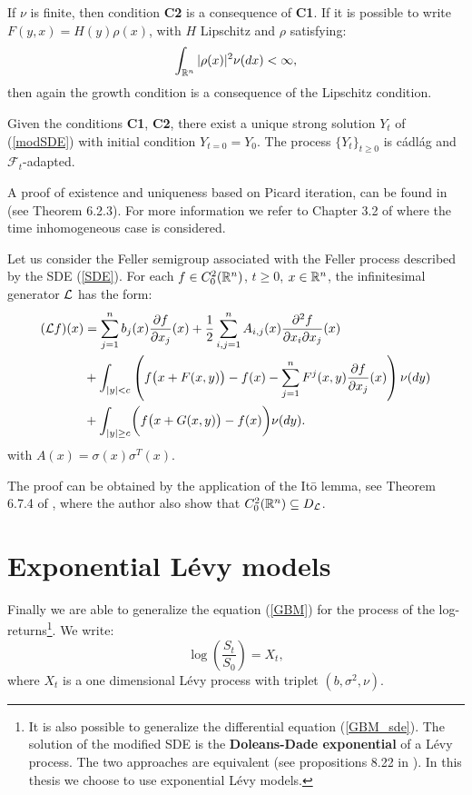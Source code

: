 If $\nu$ is finite, then condition \textbf{C2} is a consequence of \textbf{C1}. If it is possible to write $F(y,x) = H(y)\rho(x)$, with $H$ Lipschitz and 
$\rho$ satisfying:
\begin{equation}\label{rho}
 \int_{\mathbb{R}^n} |\rho(x)|^2 \nu(dx) < \infty,
\end{equation}
then again the growth condition is a consequence of the Lipschitz condition.
\begin{Theorem}
 Given the conditions \textbf{C1}, \textbf{C2}, there exist a unique strong solution $Y_t$ of (\ref{modSDE}) with initial condition $Y_{t=0}=Y_{0}$.
 The process $\{Y_t\}_{t\geq 0}$ is cádlág and $\mathcal{F}_t$-adapted.
\end{Theorem}
A proof of existence and uniqueness based on Picard iteration, can be found in \cite{Applebaum} (see Theorem 6.2.3). For more information we refer to Chapter 3.2 of
\cite{Skorohod} where the time inhomogeneous case is considered. 


\begin{Theorem}
Let us consider the Feller semigroup associated with the Feller process described by the SDE (\ref{SDE}).
For each $f\in C_0^{2}(\mathbb{R}^n)$, $t\geq0$, $x\in \mathbb{R}^n$,
the infinitesimal generator $\mathcal{L}$ has the form:
\begin{align} \label{gen_jumpdiff}
  (\mathcal{L} f)(x) &=  \sum_{j=1}^n b_j(x) \frac{\partial f}{\partial x_j}(x) +
  \frac{1}{2} \sum_{i,j=1}^n A_{i,j}(x) \frac{\partial^2 f}{\partial x_i \partial x_j}(x)\\  \nonumber
           & + \int_{|y|<c} \left( f\bigl(x+F(x,y)\bigr) - f(x) - \sum_{j=1}^n F^j(x,y) \frac{\partial f}{\partial x_j}(x) \right) \nu(dy)  \\ \nonumber
           & + \int_{|y| \geq c} \biggl( f\bigl(x+G(x,y)\bigr) - f(x) \biggr) \nu(dy).   \nonumber
\end{align} 
with $A(x) = \sigma(x) \sigma^T(x)$.
\end{Theorem}
The proof can be obtained by the application of the It\={o} lemma, see Theorem 6.7.4 of \cite{Applebaum}, where the author also show that $C_0^{2}(\mathbb{R}^n) \subseteq D_{\mathcal{L}}$.   




\section{Exponential Lévy models}\label{Section_ELM}

Finally we are able to generalize the equation (\ref{GBM}) for the process of the log-returns\footnote{
It is also possible to generalize the differential equation (\ref{GBM_sde}). The solution of the modified SDE 
is the \textbf{Doleans-Dade exponential} of a Lévy process. The two approaches are equivalent (see propositions 8.22 in \cite{Cont}).
In this thesis we choose to use exponential Lévy models. }.
We write:
\begin{equation}
 \log \left( \frac{S_t}{S_0} \right) = X_t ,
\end{equation}
where $X_t$ is a one dimensional Lévy process with triplet $(b,\sigma^2,\nu)$.

